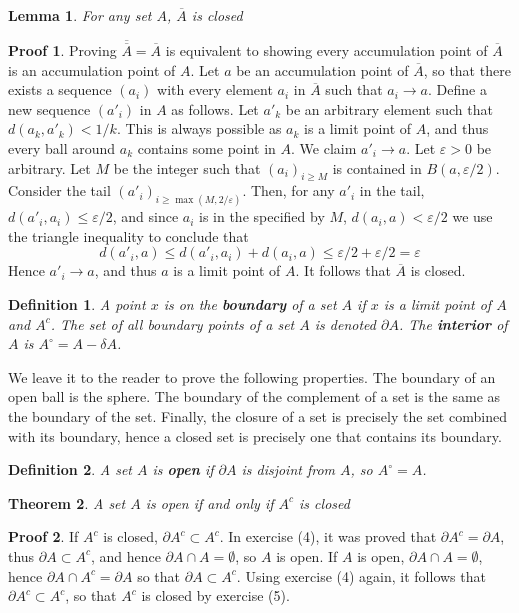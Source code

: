 \documentclass[12pt]{amsbook}
\theoremstyle{plain}
\newtheorem{definition}{Definition}
\newtheorem{theorem}{Theorem}
\newtheorem{lemma}[theorem]{Lemma}
\theoremstyle{definition}
\newtheorem*{prf}{Proof}
\begin{document}
\begin{lemma}
  For any set $A$, $\overline{A}$ is closed
\end{lemma}
\begin{prf}
  Proving $\overline{\overline{A}} = \overline{A}$ is equivalent to showing every accumulation point of $\overline{A}$ is an accumulation point of $A$. Let $a$ be an accumulation point of $\overline{A}$, so that there exists a sequence $(a_i)$ with every element $a_i$ in $\overline{A}$ such that $a_i \to a$. Define a new sequence $(a'_i)$ in $A$ as follows. Let $a'_k$ be an arbitrary element such that $d(a_k, a'_k) < 1/k$. This is always possible as $a_k$ is a limit point of $A$, and thus every ball around $a_k$ contains some point in $A$. We claim $a'_i \to a$. Let $\varepsilon > 0$ be arbitrary. Let $M$ be the integer such that $(a_i)_{i \geq M}$ is contained in $B(a,\varepsilon/2)$. Consider the tail $(a'_i)_{i \geq \max(M,2/\varepsilon)}$. Then, for any $a'_i$ in the tail, $d(a'_i, a_i) \leq \varepsilon/2$, and since $a_i$ is in the specified by $M$, $d(a_i, a) < \varepsilon/2$ we use the triangle inequality to conclude that
  \[ d(a'_i, a) \leq d(a'_i, a_i) + d(a_i, a) \leq \varepsilon/2 + \varepsilon/2 = \varepsilon \]
  Hence $a'_i \to a$, and thus $a$ is a limit point of $A$. It follows that $\overline{A}$ is closed.
\end{prf}

\begin{definition}
  A point $x$ is on the {\bf boundary} of a set $A$ if $x$ is a limit point of $A$ and $A^c$. The set of all boundary points of a set $A$ is denoted $\partial A$. The {\bf interior} of $A$ is $A^\circ = A - \delta A$.
\end{definition}

We leave it to the reader to prove the following properties. The boundary of an open ball is the sphere. The boundary of the complement of a set is the same as the boundary of the set. Finally, the closure of a set is precisely the set combined with its boundary, hence a closed set is precisely one that contains its boundary.

\begin{definition}
  A set $A$ is {\bf open} if $\partial A$ is disjoint from $A$, so $A^\circ = A$.
\end{definition}

\begin{theorem}
  A set $A$ is open if and only if $A^c$ is closed
\end{theorem}
\begin{prf}
  If $A^c$ is closed, $\partial A^c \subset A^c$. In exercise (4), it was proved that $\partial A^c = \partial A$, thus $\partial A \subset A^c$, and hence $\partial A \cap A = \emptyset$, so $A$ is open. If $A$ is open, $\partial A \cap A = \emptyset$, hence $\partial A \cap A^c = \partial A$ so that $\partial A \subset A^c$. Using exercise (4) again, it follows that $\partial A^c \subset A^c$, so that $A^c$ is closed by exercise (5). 
\end{prf}
\end{document}
